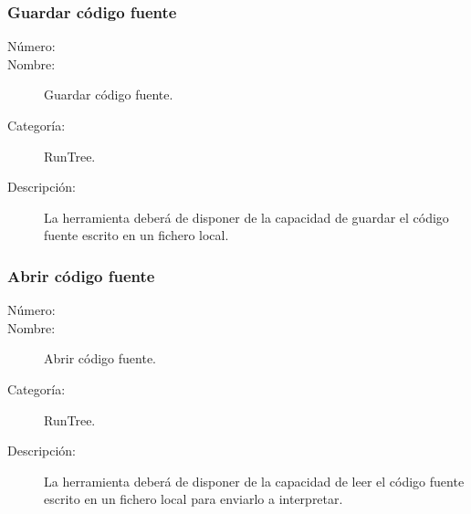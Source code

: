 \subsubsection{Guardar código fuente}
	\begin{description}
		\item [Número:] \cn
		\item [Nombre:] Guardar código fuente.
		\item [Categoría:] RunTree.
		\item [Descripción:] La herramienta deberá de disponer de la capacidad de guardar el código fuente escrito en un fichero local.
	\end {description}

\subsubsection{Abrir código fuente}
	\begin{description}
		\item [Número:] \cn
		\item [Nombre:] Abrir código fuente.
		\item [Categoría:] RunTree.
		\item [Descripción:] La herramienta deberá de disponer de la capacidad de leer el código fuente escrito en un fichero local para enviarlo a interpretar.
	\end {description}
